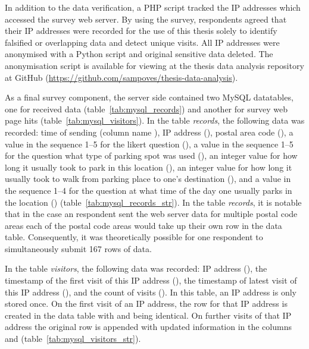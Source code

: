 In addition to the data verification, a PHP script tracked the IP addresses which accessed the survey web server. By using the survey, respondents agreed that their IP addresses were recorded for the use of this thesis solely to identify falsified or overlapping data and detect unique visits. All IP addresses were anonymised with a Python script and original sensitive data deleted. The anonymisation script is available for viewing at the thesis data analysis repository at GitHub (\textcolor{blue}{\url{https://github.com/sampoves/thesis-data-analysis}}).

As a final survey component, the server side contained two MySQL datatables, one for received data (table~\ref{tab:mysql_records}) and another for survey web page hits (table~\ref{tab:mysql_visitors}). In the table \textit{records}, the following data was recorded: time of sending (column name ), IP address (), postal area code (), a value in the sequence 1--5 for the likert question (), a value in the sequence 1--5 for the question what type of parking spot was used (), an integer value for how long it usually took to park in this location (), an integer value for how long it usually took to walk from parking place to one's destination (), and a value in the sequence 1--4 for the question at what time of the day one usually parks in the location () (table~\ref{tab:mysql_records_str}). In the table \textit{records}, it is notable that in the case an respondent sent the web server data for multiple postal code areas each of the postal code areas would take up their own row in the data table. Consequently, it was theoretically possible for one respondent to simultaneously submit 167 rows of data.

In the table \textit{visitors}, the following data was recorded: IP address (), the timestamp of the first visit of this IP address (), the timestamp of latest visit of this IP address (), and the count of visits (). In this table, an IP address is only stored once. On the first visit of an IP address, the row for that IP address is created in the data table with  and  being identical. On further visits of that IP address the original row is appended with updated information in the columns  and  (table~\ref{tab:mysql_visitors_str}).

